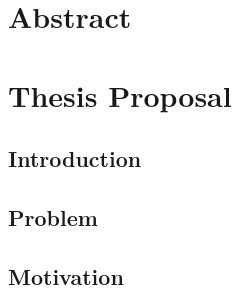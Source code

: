 \documentclass[headsepline,footsepline,footinclude=false,oneside,fontsize=11pt,paper=a4,listof=totoc,bibliography=totoc]{scrbook} %
\begin{document}
\frontmatter{}

\mainmatter{}

\chapter{Abstract}

\chapter{Thesis Proposal}

\section{Introduction}

\section{Problem}

\section{Motivation}
\end{document}
